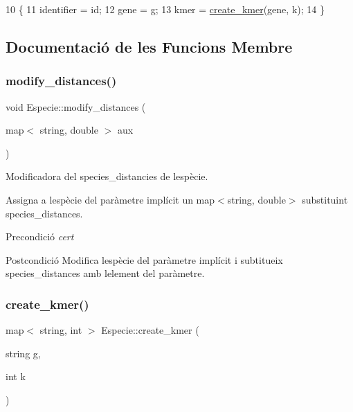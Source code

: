 \begin{DoxyCode}
10                                            \{
11     identifier = id;
12     gene = g;
13     kmer = \hyperlink{class_especie_a7e6c7615ab5458259c1f20bcd68ebd80}{create\_kmer}(gene, k);
14 \}
\end{DoxyCode}


\subsection{Documentació de les Funcions Membre}
\mbox{\label{class_especie_a9ac1aacc02f399f4c9c11cd8f67b0e46}} 
\subsubsection{\texorpdfstring{modify\+\_\+distances()}{modify\_distances()}}
{\footnotesize\ttfamily void Especie\+::modify\+\_\+distances (\begin{DoxyParamCaption}\item[{map$<$ string, double $>$}]{aux }\end{DoxyParamCaption})}



Modificadora del species\+\_\+distancies de l\textquotesingle{}espècie. 

Assigna a l\textquotesingle{}espècie del paràmetre implícit un map$<$string, double$>$ substituint species\+\_\+distances.

\begin{DoxyPrecond}{Precondició}
{\itshape cert} 
\end{DoxyPrecond}
\begin{DoxyPostcond}{Postcondició}
Modifica l\textquotesingle{}espècie del paràmetre implícit i subtitueix species\+\_\+distances amb l\textquotesingle{}element del paràmetre. 
\end{DoxyPostcond}
\mbox{\label{class_especie_a7e6c7615ab5458259c1f20bcd68ebd80}} 
\subsubsection{\texorpdfstring{create\+\_\+kmer()}{create\_kmer()}}
{\footnotesize\ttfamily map$<$ string, int $>$ Especie\+::create\+\_\+kmer (\begin{DoxyParamCaption}\item[{string}]{g,  }\item[{int}]{k }\end{DoxyParamCaption})}



